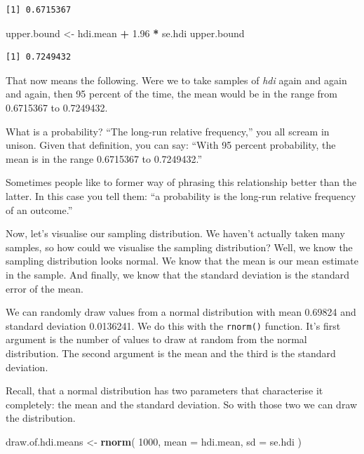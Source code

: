 \documentclass[]{article}
\newenvironment{Shaded}{\begin{snugshade}}{\end{snugshade}}
\newcommand{\KeywordTok}[1]{\textcolor[rgb]{0.13,0.29,0.53}{\textbf{#1}}}
\newcommand{\DataTypeTok}[1]{\textcolor[rgb]{0.13,0.29,0.53}{#1}}
\newcommand{\DecValTok}[1]{\textcolor[rgb]{0.00,0.00,0.81}{#1}}
\newcommand{\FloatTok}[1]{\textcolor[rgb]{0.00,0.00,0.81}{#1}}
\newcommand{\StringTok}[1]{\textcolor[rgb]{0.31,0.60,0.02}{#1}}
\newcommand{\OperatorTok}[1]{\textcolor[rgb]{0.81,0.36,0.00}{\textbf{#1}}}
\newcommand{\NormalTok}[1]{#1}
\theoremstyle{definition}
\theoremstyle{definition}
\theoremstyle{definition}
\theoremstyle{remark}
\begin{document}
\begin{verbatim}
[1] 0.6715367
\end{verbatim}

\begin{Shaded}
\begin{Highlighting}[]
\NormalTok{upper.bound <-}\StringTok{ }\NormalTok{hdi.mean }\OperatorTok{+}\StringTok{ }\FloatTok{1.96} \OperatorTok{*}\StringTok{ }\NormalTok{se.hdi}
\NormalTok{upper.bound}
\end{Highlighting}
\end{Shaded}

\begin{verbatim}
[1] 0.7249432
\end{verbatim}

That now means the following. Were we to take samples of \emph{hdi}
again and again and again, then 95 percent of the time, the mean would
be in the range from 0.6715367 to 0.7249432.

What is a probability? ``The long-run relative frequency,'' you all
scream in unison. Given that definition, you can say: ``With 95 percent
probability, the mean is in the range 0.6715367 to 0.7249432.''

Sometimes people like to former way of phrasing this relationship better
than the latter. In this case you tell them: ``a probability is the
long-run relative frequency of an outcome.''

Now, let's visualise our sampling distribution. We haven't actually
taken many samples, so how could we visualise the sampling distribution?
Well, we know the sampling distribution looks normal. We know that the
mean is our mean estimate in the sample. And finally, we know that the
standard deviation is the standard error of the mean.

We can randomly draw values from a normal distribution with mean 0.69824
and standard deviation 0.0136241. We do this with the \texttt{rnorm()}
function. It's first argument is the number of values to draw at random
from the normal distribution. The second argument is the mean and the
third is the standard deviation.

Recall, that a normal distribution has two parameters that characterise
it completely: the mean and the standard deviation. So with those two we
can draw the distribution.

\begin{Shaded}
\begin{Highlighting}[]
\NormalTok{draw.of.hdi.means <-}\StringTok{ }\KeywordTok{rnorm}\NormalTok{( }\DecValTok{1000}\NormalTok{, }\DataTypeTok{mean =}\NormalTok{ hdi.mean, }\DataTypeTok{sd =}\NormalTok{ se.hdi )}
\end{Highlighting}
\end{Shaded}
\end{document}
